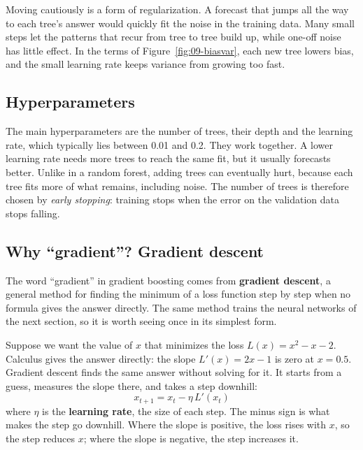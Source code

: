 Moving cautiously is a form of regularization. A forecast that jumps all the way to each tree's answer would quickly fit the noise in the training data. Many small steps let the patterns that recur from tree to tree build up, while one-off noise has little effect. In the terms of Figure~\ref{fig:09-biasvar}, each new tree lowers bias, and the small learning rate keeps variance from growing too fast.

\subsection{Hyperparameters}

The main hyperparameters are the number of trees, their depth and the learning rate, which typically lies between 0.01 and 0.2. They work together. A lower learning rate needs more trees to reach the same fit, but it usually forecasts better. Unlike in a random forest, adding trees can eventually hurt, because each tree fits more of what remains, including noise. The number of trees is therefore chosen by \emph{early stopping}: training stops when the error on the validation data stops falling.

\subsection{Why ``gradient''? Gradient descent}

The word ``gradient'' in gradient boosting comes from \textbf{gradient descent}, a general method for finding the minimum of a loss function step by step when no formula gives the answer directly. The same method trains the neural networks of the next section, so it is worth seeing once in its simplest form.

Suppose we want the value of $x$ that minimizes the loss $L(x) = x^2 - x - 2$. Calculus gives the answer directly: the slope $L'(x) = 2x - 1$ is zero at $x = 0.5$. Gradient descent finds the same answer without solving for it. It starts from a guess, measures the slope there, and takes a step downhill:
\begin{equation}
  x_{t+1} = x_t - \eta \, L'(x_t)
  \label{eq:20-gd}
\end{equation}
where $\eta$ is the \textbf{learning rate}, the size of each step. The minus sign is what makes the step go downhill. Where the slope is positive, the loss rises with $x$, so the step reduces $x$; where the slope is negative, the step increases it.

